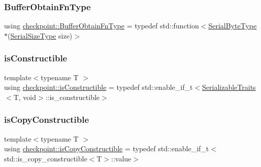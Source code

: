 \mbox{\label{namespacecheckpoint_a8a2558a1dd0db386339dd81c193b7f10}} 
\subsubsection{\texorpdfstring{Buffer\+Obtain\+Fn\+Type}{BufferObtainFnType}}
{\footnotesize\ttfamily using \hyperlink{namespacecheckpoint_a8a2558a1dd0db386339dd81c193b7f10}{checkpoint\+::\+Buffer\+Obtain\+Fn\+Type} = typedef std\+::function$<$\hyperlink{namespacecheckpoint_ae57f01cdc0b81776c23b6c7c934c58f5}{Serial\+Byte\+Type}$\ast$(\hyperlink{namespacecheckpoint_a083f6674da3f94c2901b18c6d238217c}{Serial\+Size\+Type} size)$>$}

\mbox{\label{namespacecheckpoint_a48ec2649d5cbd890f67ea1193cc0d51a}} 
\subsubsection{\texorpdfstring{is\+Constructible}{isConstructible}}
{\footnotesize\ttfamily template$<$typename T $>$ \\
using \hyperlink{namespacecheckpoint_a48ec2649d5cbd890f67ea1193cc0d51a}{checkpoint\+::is\+Constructible} = typedef std\+::enable\+\_\+if\+\_\+t$<$\hyperlink{structcheckpoint_1_1_serializable_traits}{Serializable\+Traits}$<$T, void$>$\+::is\+\_\+constructible$>$}

\mbox{\label{namespacecheckpoint_a60a9850fa59d4b236b2f888baf135a95}} 
\subsubsection{\texorpdfstring{is\+Copy\+Constructible}{isCopyConstructible}}
{\footnotesize\ttfamily template$<$typename T $>$ \\
using \hyperlink{namespacecheckpoint_a60a9850fa59d4b236b2f888baf135a95}{checkpoint\+::is\+Copy\+Constructible} = typedef std\+::enable\+\_\+if\+\_\+t$<$std\+::is\+\_\+copy\+\_\+constructible$<$T$>$\+::value$>$}

